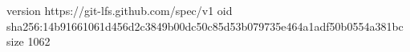 version https://git-lfs.github.com/spec/v1
oid sha256:14b91661061d456d2c3849b00dc50c85d53b079735e464a1adf50b0554a381bc
size 1062
